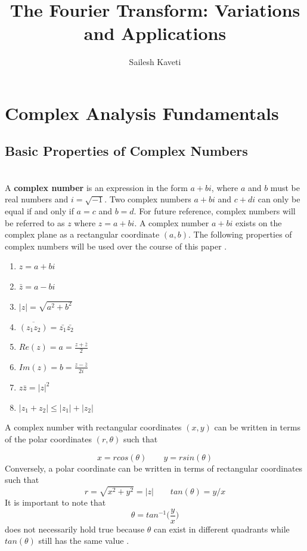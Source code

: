 \documentclass{amsproc}
\title{The Fourier Transform: Variations and Applications}
\author{Sailesh Kaveti}
\begin{document}
\maketitle


\tableofcontents
\newpage

\section{Complex Analysis Fundamentals}

\subsection{Basic Properties of Complex Numbers}

\mbox{}	 \\
\indent A \textbf{complex number} is an expression in the form $a + bi$, where $a$ and $b$ must be real numbers and $i = \sqrt{-1}$. Two complex numbers $a +bi$ and $c + di$ can only be equal if and only if $a = c$ and $b = d$. For future reference, complex numbers will be referred to as $z$ where $z = a+bi$. A complex number $a+bi$ exists on the complex plane as a rectangular coordinate $(a, b)$. The following properties of complex numbers will be used over the course of this paper \cite{Saff}.

\begin{enumerate}
	\item $z = a+bi$
	\item $\bar{z} = a - bi$
	\item $|z| = \sqrt{a^2 + b^2}$
	\item $\overline{(z_1 z_2)} = \bar{z_1}\bar{z_2}$
	\item $Re(z) = a = \frac{z + \bar{z}}{2}$
	\item $Im(z) = b = \frac{z - \bar{z}}{2i}$
	\item $z \bar{z} = |z|^2$
	\item $|z_1 + z_2| \leq |z_1| + |z_2|$
\end{enumerate}

A complex number with rectangular coordinates $(x, y)$ can be written in terms of the polar coordinates $(r, \theta)$ such that

$$
x = rcos(\theta) \qquad y = rsin(\theta)
$$
Conversely, a polar coordinate can be written in terms of rectangular coordinates such that 
$$
r = \sqrt{x^2 + y^2} = |z| \qquad 
tan(\theta) = y/x
$$
It is important to note that 
$$
\theta = tan^{-1}\Big(\frac{y}{x}\Big)
$$
does not necessarily hold true because $\theta$ can exist in different quadrants while $tan(\theta)$ still has the same value \cite{Saff}.
\end{document}
